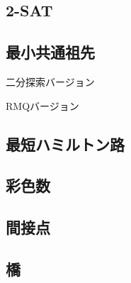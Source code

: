 \subsection{2-SAT}


\subsection{最小共通祖先}
二分探索バージョン

RMQバージョン


\subsection{最短ハミルトン路}


\subsection{彩色数}


\subsection{間接点}


\subsection{橋}

